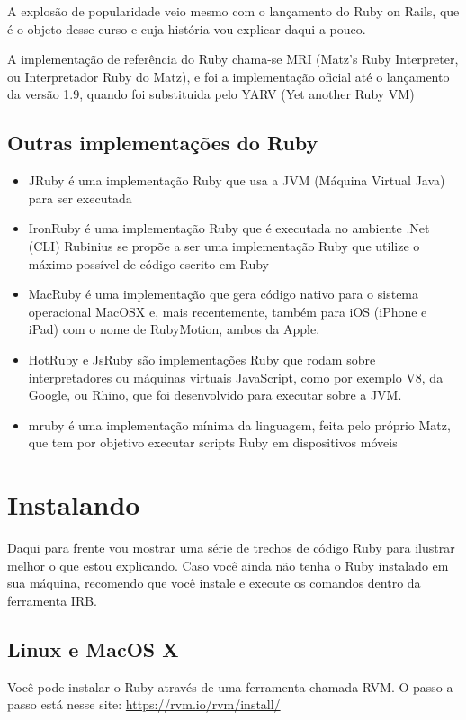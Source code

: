 \documentclass[12pt]{book} %
\begin{document}
A explosão de popularidade veio mesmo com o lançamento do Ruby on Rails, que é o objeto desse curso e cuja história vou explicar daqui a pouco.

A implementação de referência do Ruby chama-se MRI (Matz’s Ruby Interpreter, ou Interpretador Ruby do Matz), e foi a implementação oficial até o lançamento da versão 1.9, quando foi substituida pelo YARV (Yet another Ruby VM)

\subsection{Outras implementações do Ruby}

\begin{itemize}
\item JRuby é uma implementação Ruby que usa a JVM (Máquina Virtual Java) para ser executada

\item IronRuby é uma implementação Ruby que é executada no ambiente .Net (CLI)
Rubinius se propõe a ser uma implementação Ruby que utilize o máximo possível de código escrito em Ruby

\item MacRuby é uma implementação que gera código nativo para o sistema operacional MacOSX e, mais recentemente, também para iOS (iPhone e iPad) com o nome de RubyMotion, ambos da Apple.

\item HotRuby e JsRuby são implementações Ruby que rodam sobre interpretadores ou máquinas virtuais JavaScript, como por exemplo V8, da Google, ou Rhino, que foi desenvolvido para executar sobre a JVM.

\item mruby é uma implementação mínima da linguagem, feita pelo próprio Matz, que tem por objetivo executar scripts Ruby em dispositivos móveis

\end{itemize}

\section{Instalando}
Daqui para frente vou mostrar uma série de trechos de código Ruby para ilustrar melhor o que estou explicando. Caso você ainda não tenha o Ruby instalado em sua máquina, recomendo que você instale e execute os comandos dentro da ferramenta IRB.

\subsection{Linux e MacOS X}
Você pode instalar o Ruby através de uma ferramenta chamada RVM. O passo a passo está nesse site: \url{https://rvm.io/rvm/install/}
\end{document}

